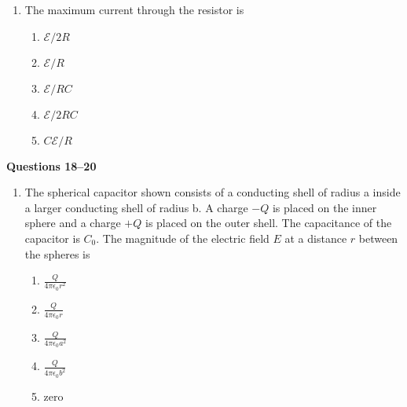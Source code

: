 \documentclass{../../oss-apphys}
\begin{document}
\begin{multicols}{2}
\begin{enumerate}[leftmargin=18pt,resume]
  \item The maximum current through the resistor is
    \begin{enumerate}[noitemsep,topsep=0pt,leftmargin=18pt,label=(\Alph*)]
    \item $\mathcal{E}/2R$
    \item $\mathcal{E}/R$
    \item $\mathcal{E}/RC$
    \item $\mathcal{E}/2RC$
    \item $C\mathcal{E}/R$
    \end{enumerate}
  \end{enumerate}
  \columnbreak
  \textbf{Questions 18--20}
  \begin{enumerate}[leftmargin=18pt,resume]
  \item The spherical capacitor shown consists of a conducting shell of radius a
    inside a larger conducting shell of radius b. A charge $−Q$ is placed on the
    inner sphere and a charge $+Q$ is placed on the outer shell. The
    capacitance of the capacitor is $C_0$. The magnitude of the electric field
    $E$ at a distance $r$ between the spheres is
    \begin{center}
    \end{center}
    \begin{enumerate}[noitemsep,topsep=0pt,leftmargin=18pt,label=(\Alph*)]    
    \item $\displaystyle\frac{Q}{4\pi\epsilon_0r^2}$
    \item $\displaystyle\frac{Q}{4\pi\epsilon_0r}$
    \item $\displaystyle\frac{Q}{4\pi\epsilon_0a^2}$
    \item $\displaystyle\frac{Q}{4\pi\epsilon_0b^2}$
    \item zero
    \end{enumerate}


\end{enumerate}
\end{multicols}
\end{document}
